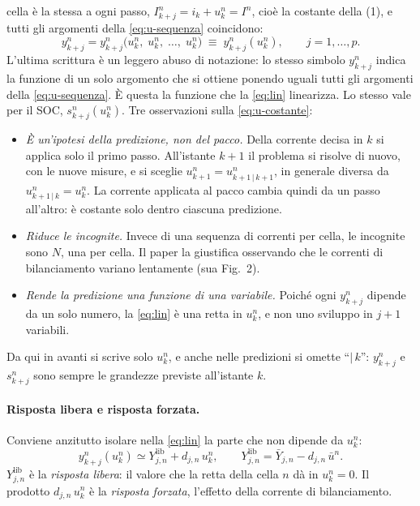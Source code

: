 \documentclass[11pt,a4paper]{article}
\newcommand{\lib}{\mathrm{lib}}
\begin{document}
cella è la stessa a ogni passo, $I^n_{k+j} = i_k + u^n_k = I^n$, cioè la
costante della (1), e tutti gli argomenti della \eqref{eq:u-sequenza}
coincidono:
\begin{equation}
  y^n_{k+j} = y^n_{k+j}\bigl(u^n_k,\; u^n_k,\; \dots,\; u^n_k\bigr)
  \;\equiv\; y^n_{k+j}(u^n_k) ,
  \qquad j = 1, \dots, p .
  \tag{U3}\label{eq:u-unica}
\end{equation}
L'ultima scrittura è un leggero abuso di notazione: lo stesso simbolo
$y^n_{k+j}$ indica la funzione di un solo argomento che si ottiene ponendo
uguali tutti gli argomenti della \eqref{eq:u-sequenza}. È questa la funzione
che la \eqref{eq:lin} linearizza. Lo stesso vale per il SOC,
$s^n_{k+j}(u^n_k)$. Tre osservazioni sulla \eqref{eq:u-costante}:
\begin{itemize}
  \item \emph{È un'ipotesi della predizione, non del pacco.} Della corrente
        decisa in $k$ si applica solo il primo passo. All'istante $k+1$ il
        problema si risolve di nuovo, con le nuove misure, e si sceglie
        $u^n_{k+1} = u^n_{k+1\,|\,k+1}$, in generale diversa da
        $u^n_{k+1\,|\,k} = u^n_k$. La corrente applicata al pacco cambia
        quindi da un passo all'altro: è costante solo dentro ciascuna
        predizione.
  \item \emph{Riduce le incognite.} Invece di una sequenza di correnti per
        cella, le incognite sono $N$, una per cella. Il paper la giustifica
        osservando che le correnti di bilanciamento variano lentamente
        (sua Fig.~2).
  \item \emph{Rende la predizione una funzione di una variabile.} Poiché ogni
        $y^n_{k+j}$ dipende da un solo numero, la \eqref{eq:lin} è una retta
        in $u^n_k$, e non uno sviluppo in $j+1$ variabili.
\end{itemize}
Da qui in avanti si scrive solo $u^n_k$, e anche nelle predizioni si omette
``$|\,k$'': $y^n_{k+j}$ e $s^n_{k+j}$ sono sempre le grandezze previste
all'istante $k$.

\paragraph{Risposta libera e risposta forzata.} Conviene anzitutto isolare
nella \eqref{eq:lin} la parte che non dipende da $u^n_k$:
\begin{equation}
  y^n_{k+j}(u^n_k) \simeq Y^\lib_{j,n} + d_{j,n}\,u^n_k,
  \qquad Y^\lib_{j,n} = \bar Y_{j,n} - d_{j,n}\,\bar u^n .
  \label{eq:y0}
\end{equation}
$Y^\lib_{j,n}$ è la \emph{risposta libera}: il valore che la retta della cella
$n$ dà in $u^n_k = 0$. Il prodotto $d_{j,n}\,u^n_k$ è la \emph{risposta forzata},
l'effetto della corrente di bilanciamento.
\end{document}
